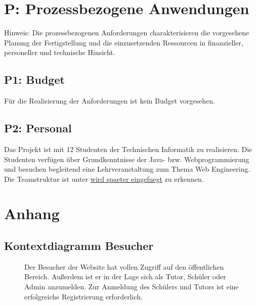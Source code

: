 \documentclass[10pt,a4paper]{scrartcl}
\begin{document}
\section{P: Prozessbezogene Anwendungen}
Hinweis: Die prozessbezogenen Anforderungen charakterisieren die vorgesehene Planung der Fertigstellung und die einzusetzenden Ressourcen in finanzieller, personeller und technische Hinsicht.

\subsection{P1: Budget}
Für die Realisierung der Anforderungen ist kein Budget vorgesehen.


\subsection{P2: Personal}
Das Projekt ist mit 12 Studenten der Technischen Informatik zu realisieren. Die Studenten verfügen über Grundkenntnisse der Java- bzw. Webprogrammierung und besuchen begleitend eine Lehrveranstaltung zum Thema Web Engineering. Die Teamstruktur ist unter \url{
wird spaeter eingefuegt} zu erkennen.

\newpage
\section{Anhang}
\subsection{Kontextdiagramm Besucher}
\begin{figure}[!htbp]
\caption{Der Besucher der Website hat vollen Zugriff auf den öffentlichen Bereich. Außerdem ist er in der Lage sich als Tutor, Schüler oder Admin anzumelden. Zur Anmeldung des Schülers und Tutors ist eine erfolgreiche Registrierung erforderlich.}
\end{figure}
\newpage
\end{document}
